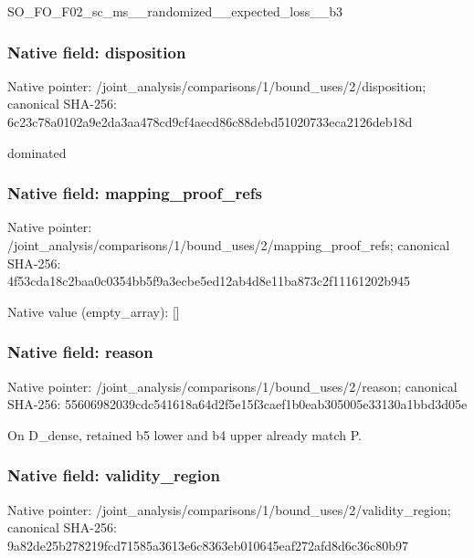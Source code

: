 \documentclass[10pt,a4paper]{article}
\begin{document}
\begingroup\raggedright\sloppy SO\_\allowbreak{}FO\_\allowbreak{}F02\_\allowbreak{}sc\_\allowbreak{}ms\_\allowbreak{}\_\allowbreak{}randomized\_\allowbreak{}\_\allowbreak{}expected\_\allowbreak{}loss\_\allowbreak{}\_\allowbreak{}b3\par\endgroup

\subsubsection{Native field: disposition}
Native pointer: /joint\_\allowbreak{}analysis/comparisons/1/bound\_\allowbreak{}uses/2/disposition; canonical SHA-256: 6c23c78a0102a9e2da3aa478cd9cf4aecd86c88debd51020733eca2126deb18d

\begingroup\raggedright\sloppy dominated\par\endgroup

\subsubsection{Native field: mapping\_\allowbreak{}proof\_\allowbreak{}refs}
Native pointer: /joint\_\allowbreak{}analysis/comparisons/1/bound\_\allowbreak{}uses/2/mapping\_\allowbreak{}proof\_\allowbreak{}refs; canonical SHA-256: 4f53cda18c2baa0c0354bb5f9a3ecbe5ed12ab4d8e11ba873c2f11161202b945

Native value (empty\_\allowbreak{}array): []

\subsubsection{Native field: reason}
Native pointer: /joint\_\allowbreak{}analysis/comparisons/1/bound\_\allowbreak{}uses/2/reason; canonical SHA-256: 55606982039cdc541618a64d2f5e15f3caef1b0eab305005e33130a1bbd3d05e

\begingroup\raggedright\sloppy On D\_\allowbreak{}dense,\allowbreak{} retained b5 lower and b4 upper already match P.\par\endgroup

\subsubsection{Native field: validity\_\allowbreak{}region}
Native pointer: /joint\_\allowbreak{}analysis/comparisons/1/bound\_\allowbreak{}uses/2/validity\_\allowbreak{}region; canonical SHA-256: 9a82de25b278219fcd71585a3613e6c8363eb010645eaf272afd8d6c36c80b97
\end{document}
